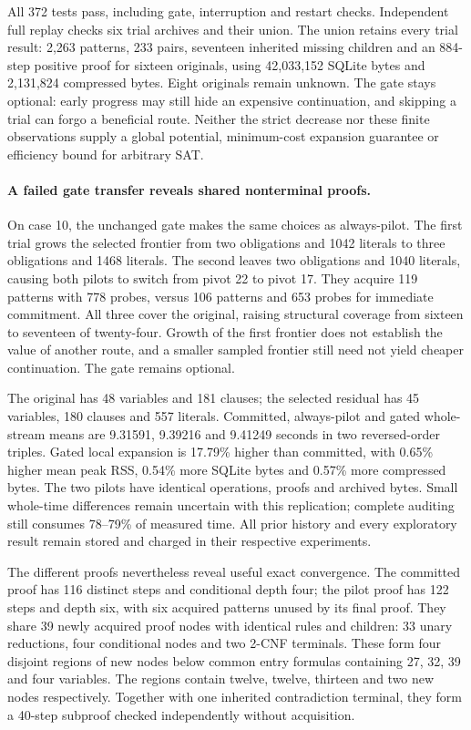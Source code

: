 \documentclass[11pt,a4paper]{article}
\numberwithin{equation}{section}
\theoremstyle{plain}
\theoremstyle{definition}
\theoremstyle{remark}
\begin{document}
All 372 tests pass, including gate, interruption and restart checks. Independent
full replay checks six trial archives and their union. The union retains every
trial result: 2,263 patterns, 233 pairs, seventeen inherited missing children
and an 884-step positive proof for sixteen originals, using 42,033,152 SQLite
bytes and 2,131,824 compressed bytes. Eight originals remain unknown. The gate
stays optional: early progress may still hide an expensive continuation, and
skipping a trial can forgo a beneficial route. Neither the strict decrease
nor these finite observations supply a global potential, minimum-cost expansion
guarantee or efficiency bound for arbitrary SAT.

\paragraph{A failed gate transfer reveals shared nonterminal proofs.}
On case 10, the unchanged gate makes the same choices as always-pilot. The
first trial grows the selected frontier from two obligations and 1042 literals
to three obligations and 1468 literals. The second leaves two obligations and
1040 literals, causing both pilots to switch from pivot 22 to pivot 17.
They acquire 119 patterns with 778 probes, versus 106 patterns and 653 probes
for immediate commitment. All three cover the original, raising structural
coverage from sixteen to seventeen of twenty-four. Growth of the first frontier
does not establish the value of another route, and a smaller sampled frontier
still need not yield cheaper continuation. The gate remains optional.

The original has 48 variables and 181 clauses; the selected residual has
45 variables, 180 clauses and 557 literals. Committed, always-pilot and gated
whole-stream means are 9.31591, 9.39216 and 9.41249 seconds in two reversed-order
triples. Gated local expansion is 17.79\% higher than committed, with 0.65\%
higher mean peak RSS, 0.54\% more SQLite bytes and 0.57\% more compressed bytes.
The two pilots have identical operations, proofs and archived bytes. Small
whole-time differences remain uncertain with this replication; complete
auditing still consumes 78--79\% of measured time. All prior history and every
exploratory result remain stored and charged in their respective experiments.

The different proofs nevertheless reveal useful exact convergence. The committed
proof has 116 distinct steps and conditional depth four; the pilot proof has
122 steps and depth six, with six acquired patterns unused by its final proof.
They share 39 newly acquired proof nodes with identical rules and children:
33 unary reductions, four conditional nodes and two 2-CNF terminals. These
form four disjoint regions of new nodes below common entry formulas containing
27, 32, 39 and four variables. The regions contain twelve, twelve, thirteen and
two new nodes respectively. Together with one inherited contradiction terminal,
they form a 40-step subproof checked independently without acquisition.
\end{document}
